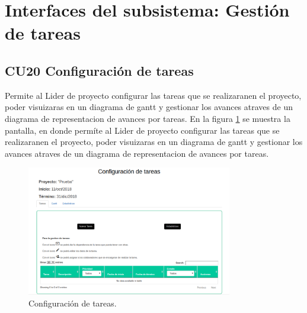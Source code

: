 \section{Interfaces del subsistema: Gestión de tareas}

\subsection{CU20 Configuración de tareas}
{
\justify
{}
}

\justify
Permite al Lider de proyecto configurar las tareas que se realizaranen el proyecto, poder visuizaras en un diagrama de gantt y gestionar los avances atraves de un diagrama de representacion de avances por tareas.
{
\justify
{}
}
\justify
En la figura \ref{fig:IU20} se muestra la pantalla, en donde permíte al Lider de proyecto configurar las tareas que se realizaranen el proyecto, poder visuizaras en un diagrama de gantt y gestionar los avances atraves de un diagrama de representacion de avances por tareas.

\begin{figure}[htb]
\centering
\includegraphics[width=0.8\textwidth]{./images/cu20-configurar-tareas.png}
\caption{Configuración de tareas.} \label{fig:IU20}
\end{figure}